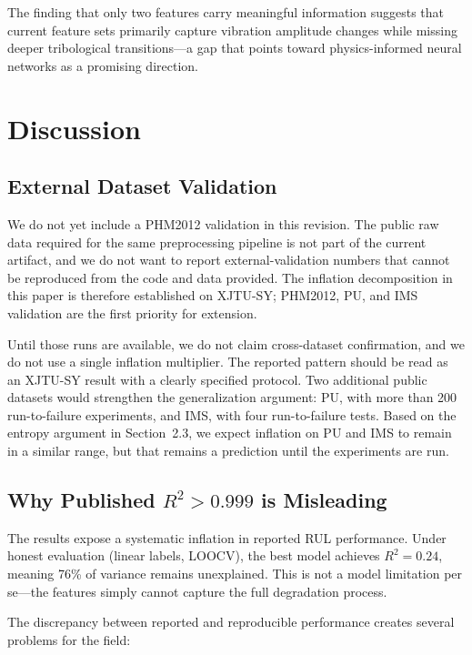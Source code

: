 \documentclass[5p,twocolumn]{elsarticle}
\begin{document}
The finding that only two features carry meaningful information suggests that current feature sets primarily capture vibration amplitude changes while missing deeper tribological transitions---a gap that points toward physics-informed neural networks \cite{li2022physics} as a promising direction.


\section{Discussion}
\label{sec:discussion}

\subsection{External Dataset Validation}

We do not yet include a PHM2012 validation in this revision. The public raw data required for the same preprocessing pipeline is not part of the current artifact, and we do not want to report external-validation numbers that cannot be reproduced from the code and data provided. The inflation decomposition in this paper is therefore established on XJTU-SY; PHM2012, PU, and IMS validation are the first priority for extension.

Until those runs are available, we do not claim cross-dataset confirmation, and we do not use a single inflation multiplier. The reported pattern should be read as an XJTU-SY result with a clearly specified protocol. Two additional public datasets would strengthen the generalization argument: PU, with more than 200 run-to-failure experiments, and IMS, with four run-to-failure tests. Based on the entropy argument in Section~2.3, we expect inflation on PU and IMS to remain in a similar range, but that remains a prediction until the experiments are run.

\subsection{Why Published $R^2 > 0.999$ is Misleading}

The results expose a systematic inflation in reported RUL performance. Under honest evaluation (linear labels, LOOCV), the best model achieves $R^2 = 0.24$, meaning 76\% of variance remains unexplained. This is not a model limitation per se---the features simply cannot capture the full degradation process.

The discrepancy between reported and reproducible performance creates several problems for the field:
\end{document}
